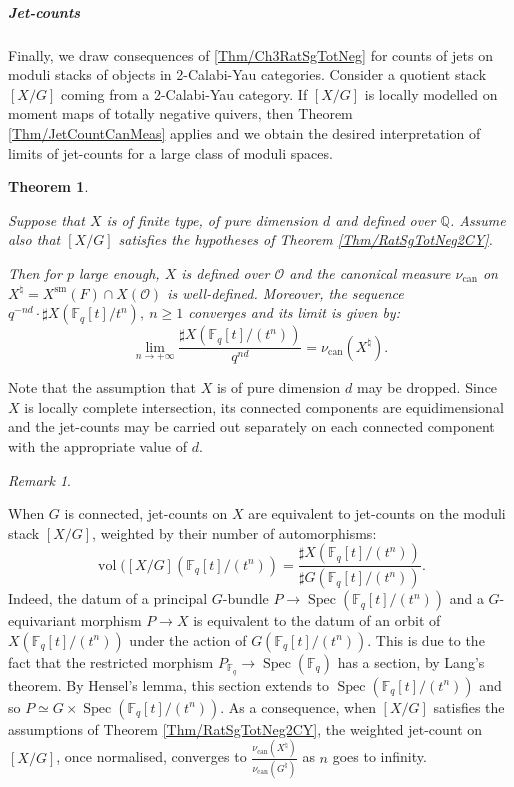\documentclass[11pt,english]{article}
\numberwithin{equation}{section}
\numberwithin{figure}{section}
\theoremstyle{definition}
\theoremstyle{plain}
\newtheorem{thm}[df]{Theorem}
\theoremstyle{remark}
\newtheorem{rmk}[df]{Remark}
\DeclareMathOperator{\vol}{vol}
\DeclareMathOperator{\Spec}{Spec}
\begin{document}
\subparagraph*{Jet-counts}

Finally, we draw consequences of \ref{Thm/Ch3RatSgTotNeg} for counts
of jets on moduli stacks of objects in 2-Calabi-Yau categories. Consider
a quotient stack $[X/G]$ coming from a 2-Calabi-Yau category. If
$[X/G]$ is locally modelled on moment maps of totally negative quivers,
then Theorem \ref{Thm/JetCountCanMeas} applies and we obtain the
desired interpretation of limits of jet-counts for a large class of
moduli spaces.

\begin{thm} \label{Thm/CanMeas2CYMod}

Suppose that $X$ is of finite type, of pure dimension $d$ and defined
over $\mathbb{Q}$. Assume also that $[X/G]$ satisfies the hypotheses
of Theorem \ref{Thm/RatSgTotNeg2CY}. 

Then for $p$ large enough, $X$ is defined over $\mathcal{O}$ and
the canonical measure $\nu_{\mathrm{can}}$ on $X^{\natural}=X^{\mathrm{sm}}(F)\cap X(\mathcal{O})$
is well-defined. Moreover, the sequence $q^{-nd}\cdot\sharp X(\mathbb{F}_{q}[t]/t^{n}),\ n\geq1$
converges and its limit is given by:\[
\underset{n\rightarrow +\infty}{\lim}\frac{\sharp X(\mathbb{F}_{q}[t]/(t^{n}))}{q^{nd}}
=
\nu_{\mathrm{can}}(X^{\natural}).
\]\end{thm}

Note that the assumption that $X$ is of pure dimension $d$ may be
dropped. Since $X$ is locally complete intersection, its connected
components are equidimensional and the jet-counts may be carried out
separately on each connected component with the appropriate value
of $d$.

\begin{rmk} \label{Rmk/CountJetsStacks}

When $G$ is connected, jet-counts on $X$ are equivalent to jet-counts
on the moduli stack $[X/G]$, weighted by their number of automorphisms:\[
\vol([X/G](\mathbb{F}_q[t]/(t^n))=\frac{\sharp X(\mathbb{F}_q[t]/(t^n))}{\sharp G(\mathbb{F}_q[t]/(t^n))}.
\]Indeed, the datum of a principal $G$-bundle $P\rightarrow\Spec(\mathbb{F}_{q}[t]/(t^{n}))$
and a $G$-equivariant morphism $P\rightarrow X$ is equivalent to
the datum of an orbit of $X(\mathbb{F}_{q}[t]/(t^{n}))$ under the
action of $G(\mathbb{F}_{q}[t]/(t^{n}))$. This is due to the fact
that the restricted morphism $P_{\mathbb{F}_{q}}\rightarrow\Spec(\mathbb{F}_{q})$
has a section, by Lang's theorem. By Hensel's lemma, this section
extends to $\Spec(\mathbb{F}_{q}[t]/(t^{n}))$ and so $P\simeq G\times\Spec(\mathbb{F}_{q}[t]/(t^{n}))$.
As a consequence, when $[X/G]$ satisfies the assumptions of Theorem
\ref{Thm/RatSgTotNeg2CY}, the weighted jet-count on $[X/G]$, once
normalised, converges to $\frac{\nu_{\mathrm{can}}(X^{\natural})}{\nu_{\mathrm{can}}(G^{\natural})}$
as $n$ goes to infinity.

\end{rmk}
\end{document}
